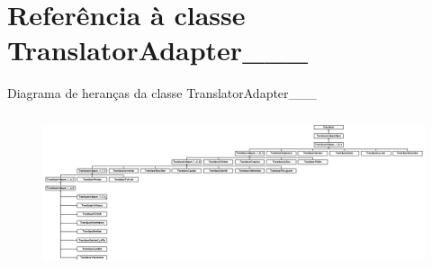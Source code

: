 \hypertarget{class_translator_adapter__1__8__4}{\section{Referência à classe Translator\-Adapter\-\_\-\_\-\_}
\label{class_translator_adapter__1__8__4}
}
Diagrama de heranças da classe Translator\-Adapter\-\_\-\_\-\_\begin{figure}[H]
\begin{center}
\leavevmode
\includegraphics[height=4.552845cm]{class_translator_adapter__1__8__4}
\end{center}
\end{figure}
